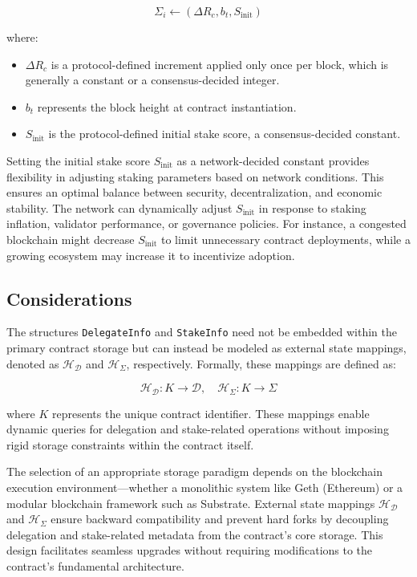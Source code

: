 \documentclass{article}
\begin{document}
\begin{equation}
\Sigma_i \gets (\Delta R_c, b_t, S_{\text{init}})
\end{equation}

where:
\begin{itemize}
    \item $\Delta R_c$ is a protocol-defined increment applied only once per block, which is generally a constant or a consensus-decided integer.
    \item $b_t$ represents the block height at contract instantiation.
    \item \( S_{\text{init}} \) is the protocol-defined initial stake score, a consensus-decided constant.
\end{itemize}

Setting the initial stake score \( S_{\text{init}} \) as a network-decided constant provides flexibility in adjusting staking parameters based on network conditions. This ensures an optimal balance between security, decentralization, and economic stability. The network can dynamically adjust \( S_{\text{init}} \) in response to staking inflation, validator performance, or governance policies. For instance, a congested blockchain might decrease \( S_{\text{init}} \) to limit unnecessary contract deployments, while a growing ecosystem may increase it to incentivize adoption. 

\subsection{Considerations}  

The structures \texttt{DelegateInfo} and \texttt{StakeInfo} need not be embedded within the primary contract storage but can instead be modeled as external state mappings, denoted as $\mathcal{H}_\mathcal{D}$ and $\mathcal{H}_\Sigma$, respectively. Formally, these mappings are defined as:

\begin{equation}
\mathcal{H}_\mathcal{D}: K \to \mathcal{D}, \quad \mathcal{H}_\Sigma: K \to \Sigma
\end{equation}

where $K$ represents the unique contract identifier. These mappings enable dynamic queries for delegation and stake-related operations without imposing rigid storage constraints within the contract itself.

The selection of an appropriate storage paradigm depends on the blockchain execution environment—whether a monolithic system like Geth (Ethereum) or a modular blockchain framework such as Substrate. External state mappings $\mathcal{H}_\mathcal{D}$ and $\mathcal{H}_\Sigma$ ensure backward compatibility and prevent hard forks by decoupling delegation and stake-related metadata from the contract's core storage. This design facilitates seamless upgrades without requiring modifications to the contract's fundamental architecture.
\end{document}
